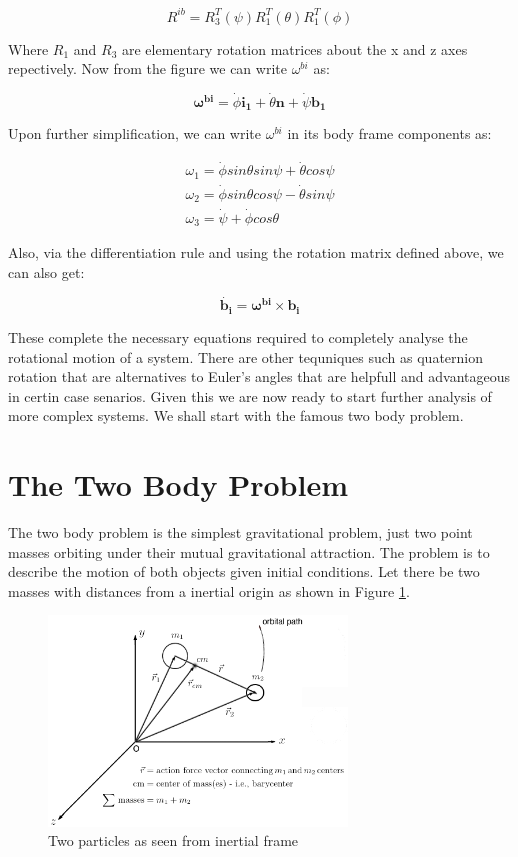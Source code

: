\documentclass[12pt, letterpaper]{article}
\begin{document}
\begin{displaymath}
R^{ib} = R_3^{T}(\psi)R_1^{T}(\theta)R_1^{T}(\phi)
\end{displaymath}

Where $R_1$ and $R_3$ are elementary rotation matrices about the x and z axes repectively. Now from the figure we can write $\omega^{bi}$ as:

\begin{displaymath}
\mathbf{\omega^{bi}} = \dot{\phi}\mathbf{i_1} + \dot{\theta}\mathbf{n} + \dot{\psi}\mathbf{b_1}
\end{displaymath}

Upon further simplification, we can write $\omega^{bi}$ in its body frame components as:

\begin{gather*}
\omega_1 = \dot{\phi}sin{\theta}sin{\psi} + \dot{\theta}cos\psi\\
\omega_2 = \dot{\phi}sin{\theta}cos{\psi} - \dot{\theta}sin\psi\\
\omega_3 = \dot{\psi} + \dot{\phi}cos\theta
\end{gather*}

Also, via the differentiation rule and using the rotation matrix defined above, we can also get:

\begin{displaymath}
\dot{\mathbf{b_i}} = \mathbf{\omega^{bi}}\times\mathbf{b_i}
\end{displaymath}

These complete the necessary equations required to completely analyse the rotational motion of a system. There are other tequniques such as quaternion rotation that are alternatives to Euler's angles that are helpfull and advantageous in certin case senarios. Given this we are now ready to start further analysis of more complex systems. We shall start with the famous two body problem.

\newpage
\section{The Two Body Problem}
 The two body problem is the simplest gravitational problem, just two point masses orbiting under their mutual gravitational attraction. The problem is to describe the motion of both objects given initial conditions. Let there be two masses with distances from a inertial origin as shown in Figure \ref{fig:two}.

\begin{figure}[h]
	\centering
    \includegraphics[width = 300px]{Twobodies}
    \caption{Two particles as seen from inertial frame}
    \label{fig:two}
\end{figure}
\end{document}
